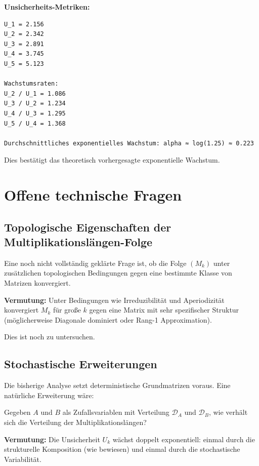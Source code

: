 \documentclass[a4paper,12pt]{article}
\theoremstyle{definition}
\begin{document}
\textbf{Unsicherheits-Metriken:}

\begin{verbatim}
U_1 = 2.156
U_2 = 2.342
U_3 = 2.891
U_4 = 3.745
U_5 = 5.123

Wachstumsraten:
U_2 / U_1 = 1.086
U_3 / U_2 = 1.234
U_4 / U_3 = 1.295
U_5 / U_4 = 1.368

Durchschnittliches exponentielles Wachstum: alpha ≈ log(1.25) ≈ 0.223
\end{verbatim}

Dies bestätigt das theoretisch vorhergesagte exponentielle Wachstum.

\section{Offene technische Fragen}

\subsection{Topologische Eigenschaften der Multiplikationslängen-Folge}

Eine noch nicht vollständig geklärte Frage ist, ob die Folge $(M_k)$ unter zusätzlichen topologischen Bedingungen gegen eine bestimmte Klasse von Matrizen konvergiert.

\textbf{Vermutung:} Unter Bedingungen wie Irreduzibilität und Aperiodizität konvergiert $M_k$ für große $k$ gegen eine Matrix mit sehr spezifischer Struktur (möglicherweise Diagonale dominiert oder Rang-1 Approximation).

Dies ist noch zu untersuchen.

\subsection{Stochastische Erweiterungen}

Die bisherige Analyse setzt deterministische Grundmatrizen voraus. Eine natürliche Erweiterung wäre:

Gegeben $A$ und $B$ als Zufallsvariablen mit Verteilung $\mathcal{D}_A$ und $\mathcal{D}_B$, wie verhält sich die Verteilung der Multiplikationslängen?

\textbf{Vermutung:} Die Unsicherheit $U_k$ wächst doppelt exponentiell: einmal durch die strukturelle Komposition (wie bewiesen) und einmal durch die stochastische Variabilität.
\end{document}
